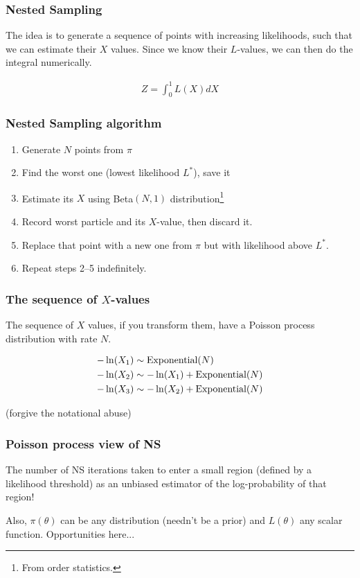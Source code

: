 \documentclass{beamer}
\begin{document}
\begin{frame}
\frametitle{Nested Sampling}
The idea is to generate a sequence of points with increasing
likelihoods, such that we can estimate their $X$ values. Since
we know their $L$-values, we can then do the integral 
numerically.

\begin{align}
Z = \int_0^1 L(X) dX
\end{align}

\end{frame}


\begin{frame}
\frametitle{Nested Sampling algorithm}

\begin{enumerate}
  \item<2-> Generate $N$ points from $\pi$
  \item<3-> Find the worst one (lowest likelihood $L^*$), save it
  \item<4-> Estimate its $X$ using Beta$(N,1)$ distribution\footnote{From order statistics.}
  \item<5-> Record worst particle and its $X$-value, then discard it.
  \item<6-> Replace that point with a new one from $\pi$ but with
        likelihood above $L^*$.
  \item<7-> Repeat steps 2--5 indefinitely.
\end{enumerate}
\end{frame}


\begin{frame}
\frametitle{The sequence of $X$-values}
The sequence of $X$ values, if you transform them, have
a Poisson process distribution with rate $N$.

\begin{align}
-\ln(X_1) &\sim \textnormal{Exponential}(N) \\
-\ln(X_2) &\sim -\ln(X_1) + \textnormal{Exponential}(N) \\
-\ln(X_3) &\sim -\ln(X_2) + \textnormal{Exponential}(N) 
\end{align}

(forgive the notational abuse)

\end{frame}

\begin{frame}
\frametitle{Poisson process view of NS}

The number of NS iterations taken
to enter a small region (defined by a likelihood threshold) 
as an unbiased estimator of the log-probability
of that region!\vspace{0.7em}

Also, $\pi(\theta)$ can be any distribution (needn't be
a prior) and $L(\theta)$ any scalar function. Opportunities here...

\end{frame}
\end{document}
